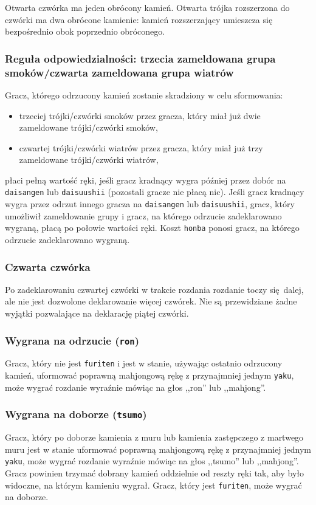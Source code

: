Otwarta czwórka ma jeden obrócony kamień.
Otwarta trójka rozszerzona do czwórki ma dwa obrócone kamienie: kamień
rozszerzający umieszcza się bezpośrednio obok poprzednio obróconego.

\subsubsection{Reguła odpowiedzialności: trzecia zameldowana grupa smoków/czwarta
zameldowana grupa wiatrów}
Gracz, którego odrzucony kamień zostanie skradziony w celu sformowania:
\begin{itemize}
    \item trzeciej trójki/czwórki smoków przez gracza, który miał już dwie
        zameldowane trójki/czwórki smoków,
    \item czwartej trójki/czwórki wiatrów przez gracza, który miał już trzy
        zameldowane trójki/czwórki wiatrów,
\end{itemize}
płaci pełną wartość ręki, jeśli gracz kradnący wygra później przez dobór na
\texttt{daisangen} lub \texttt{daisuushii} (pozostali gracze nie płacą nic).
Jeśli gracz kradnący wygra przez odrzut innego gracza na \texttt{daisangen} lub
\texttt{daisuushii}, gracz, który umożliwił zameldowanie grupy i gracz, na
którego odrzucie zadeklarowano wygraną, płacą po połowie wartości ręki.
Koszt \texttt{honba} ponosi gracz, na którego odrzucie zadeklarowano wygraną.

\subsubsection{Czwarta czwórka}
Po zadeklarowaniu czwartej czwórki w trakcie rozdania rozdanie toczy się dalej,
ale nie jest dozwolone deklarowanie więcej czwórek.
Nie są przewidziane żadne wyjątki pozwalające na deklarację piątej czwórki.

\subsubsection{Wygrana na odrzucie (\texttt{ron})}
Gracz, który nie jest \texttt{furiten} i jest w stanie, używając ostatnio
odrzucony kamień, uformować poprawną mahjongową rękę z przynajmniej jednym
\texttt{yaku}, może wygrać rozdanie wyraźnie mówiąc na głos ,,ron'' lub
,,mahjong''.

\subsubsection{Wygrana na doborze (\texttt{tsumo})}
Gracz, który po doborze kamienia z muru lub kamienia zastępczego z martwego muru
jest w stanie uformować poprawną mahjongową rękę z przynajmniej jednym
\texttt{yaku}, może wygrać rozdanie wyraźnie mówiąc na głos ,,tsumo'' lub
,,mahjong''.
Gracz powinien trzymać dobrany kamień oddzielnie od reszty ręki tak, aby było
widoczne, na którym kamieniu wygrał.
Gracz, który jest \texttt{furiten}, może wygrać na doborze.

